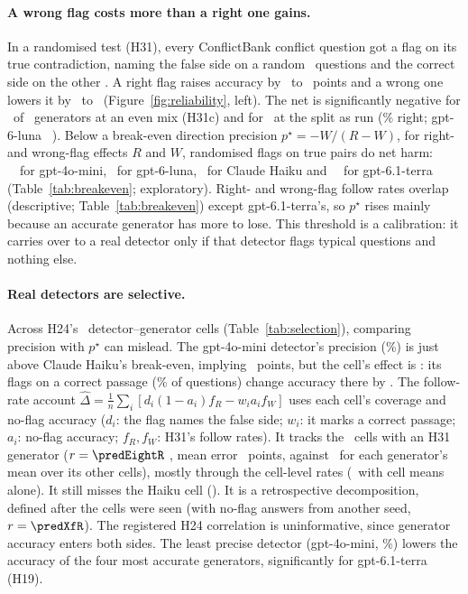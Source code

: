 \paragraph{A wrong flag costs more than a right one gains.} In a randomised test (H31), every ConflictBank conflict
question got a flag on its true contradiction, naming the false side on a random \nRandRight\ questions and the
correct side on the other \nRandWrong. A right flag raises accuracy by \hThirtyOneAMin\ to \hThirtyOneAMax\ points and
a wrong one lowers it by \ahThirtyOneBMax\ to \ahThirtyOneBMin\ (Figure~\ref{fig:reliability}, left). The net is
significantly negative for \nHThirtyOneCSig\ of \nHThirtyOneCTests\ generators at an even mix (H31c) and for
\nRealThirtyOneSig\ at the split as run (\shareRight\% right; gpt-6-luna \realThirtyOneLuna\ \realThirtyOneLunaCI).
Below a break-even direction precision $p^\star=-W/(R-W)$, for right- and wrong-flag effects $R$ and $W$, randomised
flags on true pairs do net harm: \beMini\ \beMiniCI\ for gpt-4o-mini, \beLuna\ for gpt-6-luna, \beHaiku\ for Claude
Haiku and \beTerra\ \beTerraCI\ for gpt-6.1-terra (Table~\ref{tab:breakeven}; exploratory). Right- and wrong-flag
follow rates overlap (descriptive; Table~\ref{tab:breakeven}) except gpt-6.1-terra's, so $p^\star$ rises mainly
because an accurate generator has more to lose. This threshold is a calibration: it carries over to a real detector only if
that detector flags typical questions and nothing else.

\paragraph{Real detectors are selective.} Across H24's \hTwentyFourCells\ detector--generator cells
(Table~\ref{tab:selection}), comparing precision with $p^\star$ can mislead. The gpt-4o-mini detector's precision
(\selHaikuMiniPrec\%) is just above Claude Haiku's break-even, implying \selHaikuMiniMarg\ points, but the cell's effect is
\selHaikuMiniObs: its flags on a correct passage (\selHaikuMiniWrongShare\% of questions) change accuracy there by
\selHaikuMiniWrongGain. The follow-rate account
$\hat\Delta=\frac1n\sum_i[d_i(1-a_i)f_R-w_ia_if_W]$ uses each cell's coverage and no-flag accuracy ($d_i$: the flag
names the false side; $w_i$: it marks a correct passage; $a_i$: no-flag accuracy; $f_R,f_W$: H31's follow rates). It
tracks the \predEightN\ cells with an H31 generator
($r=\predEightR$ \predEightRCI, mean error \predEightMae\ points, against \predGenMae\ for each generator's mean over
its other cells), mostly through the cell-level rates (\predMargMae\ with cell means alone). It still misses the
Haiku cell (\predHaikuMini). It is a retrospective decomposition, defined after the cells were seen (with no-flag
answers from another seed, $r=\predXfR$). The registered H24 correlation is uninformative, since generator accuracy
enters both sides. The least precise detector (gpt-4o-mini, \dirPrecMini\%) lowers the accuracy of the four most
accurate generators, significantly for gpt-6.1-terra (H19).

